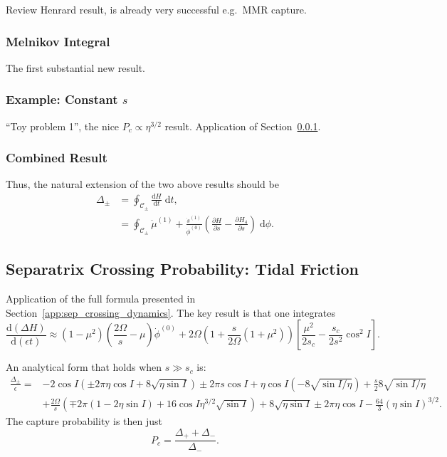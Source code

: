 \documentclass[
        fleqn,
        usenatbib,
        referee,
    ]{mnras}
\newcommand*{\rd}[2]{\frac{\mathrm{d}#1}{\mathrm{d}#2}}
\newcommand*{\pd}[2]{\frac{\partial#1}{\partial#2}}
\newcommand*{\p}[1]{\left(#1\right)}
\newcommand*{\s}[1]{\left[#1\right]}
\begin{document}
Review Henrard result, is already very successful e.g.\ MMR capture.

\subsubsection{Melnikov Integral}\label{sss:Melnikov}

The first substantial new result.

\subsubsection{Example: Constant $s$}

``Toy problem 1'', the nice $P_c \propto \eta^{3/2}$ result. Application of
Section~\ref{sss:Melnikov}.

\subsubsection{Combined Result}

Thus, the natural extension of the two above results should be
\begin{align}
    \Delta_{\pm} &= \oint_{\mathcal{C}_{\pm}} \rd{H}{t}\;\mathrm{d}t,\\
        &= \oint_{\mathcal{C}_{\pm}}
            \dot{\mu}^{(1)} + \frac{\dot{s}^{(1)}}{\dot{\phi}^{(0)}}
                \p{\pd{H}{s} - \pd{H_4}{s}}\;\mathrm{d}\phi.
\end{align}

\subsection{Separatrix Crossing Probability: Tidal Friction}\label{app:probs}

Application of the full formula presented in
Section~\ref{app:sep_crossing_dynamics}. The key result is that one integrates
\begin{equation}
    \rd{(\Delta H)}{(\epsilon t)} \approx
            (1 - \mu^2)\p{\frac{2\Omega}{s} - \mu}
                \dot{\phi}^{(0)} + 2\Omega\p{1 + \frac{s}{2\Omega}(1 + \mu^2)}
                \s{\frac{\mu^2}{2s_c} - \frac{s_c}{2s^2}\cos^2 I}.
\end{equation}

An analytical form that holds when $s \gg s_c$ is:
\begin{align}
    \frac{\Delta_{\pm}}{\epsilon} ={}&
        -2\cos I\p{\pm 2\pi \eta \cos I + 8\sqrt{\eta \sin I}}
        \pm 2\pi s\cos I
        + \eta \cos I \p{-8\sqrt{\sin I / \eta}}
            + \frac{s}{2}8\sqrt{\sin I/\eta}\nonumber\\
        &+ \frac{2\Omega}{s}\p{\mp 2\pi\p{1 - 2\eta \sin I}
            + 16\cos I \eta^{3/2}\sqrt{\sin I}}
            + 8\sqrt{\eta \sin I}
            \pm 2 \pi \eta \cos I
            - \frac{64}{3} \p{\eta \sin I}^{3/2}.
\end{align}
The capture probability is then just
\begin{equation}
    P_c = \frac{\Delta_+ + \Delta_-}{\Delta_-}.
\end{equation}

\bsp
\label{lastpage} %
\end{document}

